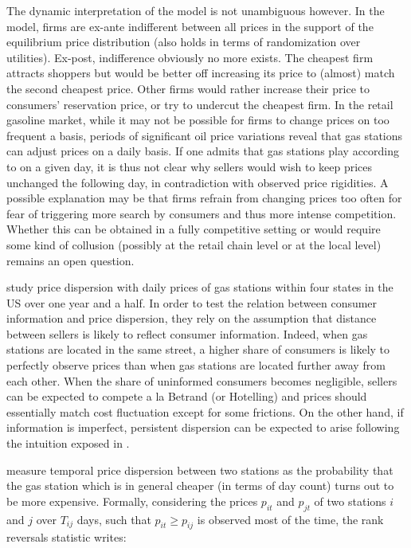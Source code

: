 \documentclass[english]{article}
\begin{document}
The dynamic interpretation of the model is not unambiguous however. In the model, firms are ex-ante indifferent between all prices in the support of the equilibrium price distribution (also holds in terms of randomization over utilities). Ex-post, indifference obviously no more exists. The cheapest firm attracts shoppers but would be better off increasing its price to (almost) match the second cheapest price. Other firms would rather increase their price to consumers' reservation price, or try to undercut the cheapest firm. In the retail gasoline market, while it may not be possible for firms to change prices on too frequent a basis, periods of significant oil price variations reveal that gas stations can adjust prices on a daily basis. If one admits that gas stations play according to \cite{VAR80} on a given day, it is thus not clear why sellers would wish to keep prices unchanged the following day, in contradiction with observed price rigidities. A possible explanation may be that firms refrain from changing prices too often for fear of triggering more search by consumers and thus more intense competition. Whether this can be obtained in a fully competitive setting  or would require some kind of collusion (possibly at the retail chain level or at the local level) remains an open question.

\cite{TAP11} study price dispersion with daily prices of gas stations within four states in the US over one year and a half. In order to test the relation between consumer information and price dispersion, they rely on the assumption that distance between sellers is likely to reflect consumer information. Indeed, when gas stations are located in the same street, a higher share of consumers is likely to perfectly observe prices than when gas stations are located further away from each other. When the share of uninformed consumers becomes negligible, sellers can be expected to compete a la Betrand (or Hotelling) and prices should essentially match cost fluctuation except for some frictions. On the other hand, if information is imperfect, persistent dispersion can be expected to arise following the intuition exposed in \cite{VAR80}. 

\cite{TAP11} measure temporal price dispersion between two stations as the probability that the gas station which is in general cheaper (in terms of day count) turns out to be more expensive. Formally, considering the prices $p_{it}$ and $p_{jt}$ of two stations $i$ and $j$ over $T_{ij}$ days, such that $p_{it} \ge p_{ij}$ is observed most of the time, the rank reversals statistic writes:
\end{document}
